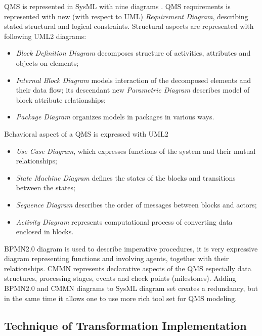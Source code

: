 \documentclass[12pt,a4paper]{llncs}
\begin{document}
QMS is represented in SysML with nine diagrams \cite{sysmlpres}.  QMS requirements is represented with new (with respect to UML) \emph{Requirement Diagram}, describing stated structural and logical constraints. Structural aspects are represented with following UML2 diagrams:
\begin{itemize}
\item \emph{Block Definition Diagram} decomposes structure of activities, attributes and objects on elements;
\item \emph{Internal Block Diagram} models interaction of the decomposed elements and their data flow; its descendant new \emph{Parametric Diagram} describes model of block attribute relationships;
\item \emph{Package Diagram} organizes models in packages in various ways.
\end{itemize}
Behavioral aspect of a QMS is expressed with UML2
\begin{itemize}
\item \emph{Use Case Diagram}, which expresses functions of the system and their mutual relationships;
\item \emph{State Machine Diagram} defines the states of the blocks and transitions between the states;
\item \emph{Sequence Diagram} describes the order of messages between blocks and actors;
\item \emph{Activity Diagram} represents computational process of converting data enclosed in blocks.
\end{itemize}

BPMN2.0 diagram is used to describe imperative procedures, it is very expressive diagram representing functions and involving agents, together with their relationships.  CMMN represents declarative aspects of the QMS especially data structures, processing stages, events and check points (milestones).  Adding BPMN2.0 and CMMN diagrams to SysML diagram set creates a redundancy, but in the same time it allows one to use more rich tool set for QMS modeling.

\subsection{Technique of Transformation Implementation}
\label{sec:tech-imp}
\end{document}
